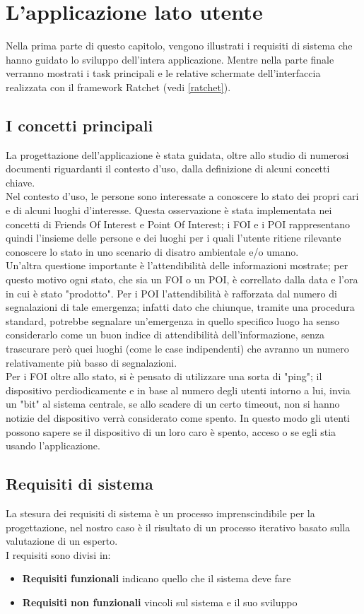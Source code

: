 \chapter{L'applicazione lato utente}
Nella prima parte di questo capitolo, vengono illustrati i requisiti di sistema che hanno guidato lo sviluppo dell'intera applicazione. Mentre nella parte finale verranno mostrati i task principali e le relative schermate dell'interfaccia realizzata con il framework Ratchet (vedi \ref{ratchet}).
\section{I concetti principali}
La progettazione dell'applicazione è stata guidata, oltre allo studio di numerosi documenti riguardanti il contesto d'uso, dalla definizione di alcuni concetti chiave. \\
Nel contesto d'uso, le persone sono interessate a conoscere lo stato dei propri cari e di alcuni luoghi d'interesse. Questa osservazione è stata implementata nei concetti di Friends Of Interest e Point Of Interest; i FOI e i POI rappresentano quindi l'insieme delle persone e dei luoghi per i quali l'utente ritiene rilevante conoscere lo stato in uno scenario di disatro ambientale e/o umano.\\
Un'altra questione importante è l'attendibilità delle informazioni mostrate; per questo motivo ogni stato, che sia un FOI o un POI, è correllato dalla data e l'ora in cui è stato "prodotto". Per i POI l'attendibilità è rafforzata dal numero di segnalazioni di tale emergenza; infatti dato che chiunque, tramite una procedura standard, potrebbe segnalare un'emergenza in quello specifico luogo ha senso considerarlo come un buon indice di attendibilità dell'informazione, senza trascurare però quei luoghi (come le case indipendenti) che avranno un numero relativamente più basso di segnalazioni.\\
Per i FOI oltre allo stato, si è pensato di utilizzare una sorta di "ping";  il dispositivo perdiodicamente e in base al numero degli utenti intorno a lui, invia un "bit" al sistema centrale, se allo scadere di un certo timeout, non si hanno notizie del dispositivo verrà considerato come spento. In questo modo gli utenti possono sapere se il dispositivo di un loro caro è spento, acceso o se egli stia usando l'applicazione. 

\section{Requisiti di sistema}
La stesura dei requisiti di sistema è un processo imprenscindibile per la progettazione, nel nostro caso è il risultato di un processo iterativo basato sulla valutazione di un esperto.\\
I requisiti sono divisi in:
\begin{itemize}
\item \textbf{Requisiti funzionali} indicano quello che il sistema deve fare
\item \textbf{Requisiti non funzionali} vincoli sul sistema e il suo sviluppo
\end{itemize}
 
